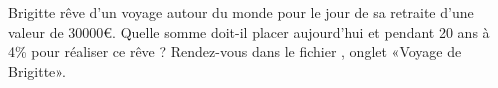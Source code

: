
\begin{exercice}\label{exosmath-0313}

Brigitte rêve d’un voyage autour du monde pour le jour de sa retraite d’une valeur de $30 000$€. Quelle somme doit-il placer aujourd'hui et pendant 20 ans à 4\% pour réaliser ce rêve ? Rendez-vous dans le fichier , onglet «Voyage de Brigitte». 

\end{exercice}
